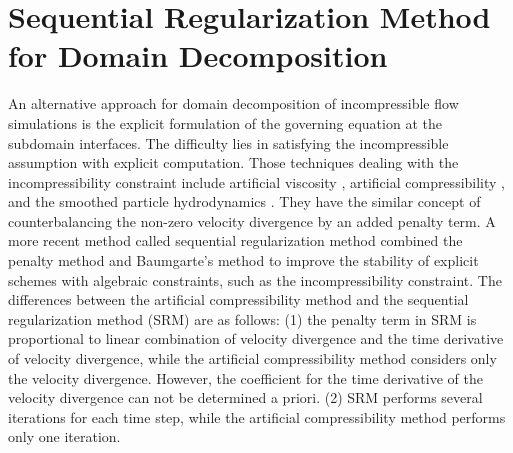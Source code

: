 \normalsize
\chapter{Sequential Regularization Method for Domain Decomposition}
\label{chapter:SRM-DDM}

An alternative approach for domain decomposition of incompressible flow simulations is the explicit formulation of the governing equation at the subdomain interfaces. The difficulty lies in satisfying the incompressible assumption with explicit computation. Those techniques dealing with the incompressibility constraint include artificial viscosity \cite{Lohner1990}, artificial compressibility \cite{Chorin1980}, and the smoothed particle hydrodynamics \cite{Monaghan1992, Monaghan1994}. They have the similar concept of counterbalancing the non-zero velocity divergence by an added penalty term. A more recent method called sequential regularization method \cite{Lin1997, Lin2003} combined the penalty method and Baumgarte's method \cite{Baumgarte1972, Ascher1995, Lin2002} to improve the stability of explicit schemes with algebraic constraints, such as the incompressibility constraint. The differences between the artificial compressibility method and the sequential regularization method (SRM) are as follows:  (1) the penalty term in SRM is proportional to linear combination of velocity divergence and the time derivative of velocity divergence, while the artificial compressibility method considers only the velocity divergence. However, the coefficient for the time derivative of the velocity divergence can not be determined a priori. (2) SRM performs several iterations for each time step, while the artificial compressibility method performs only one iteration.

